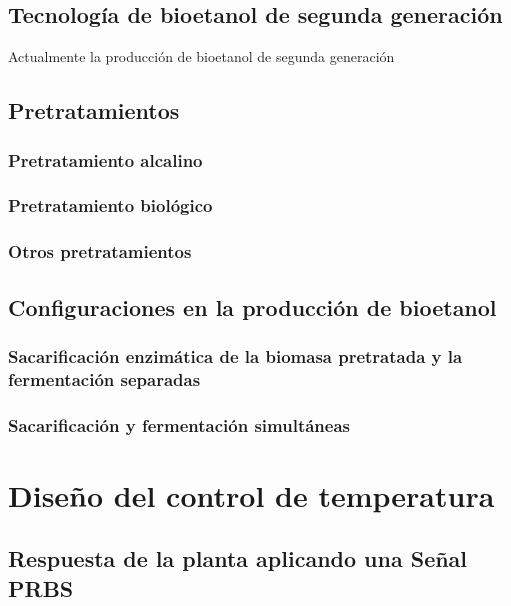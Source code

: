 \documentclass[12pt]{article}
\begin{document}
\subsection{Tecnología de bioetanol de segunda generación}
Actualmente la producción de bioetanol de segunda generación
\subsection{Pretratamientos }

\subsubsection{Pretratamiento alcalino }
\subsubsection{Pretratamiento biológico }
\subsubsection{Otros pretratamientos }


\subsection{Configuraciones en la producción de bioetanol}

\subsubsection{Sacarificación enzimática de la biomasa pretratada y la fermentación separadas }
\subsubsection{Sacarificación y fermentación simultáneas }
\newpage
		
		
	
	
	\section{Diseño del control de temperatura}
	
	\label{diseño del control de temp}
	
	
	
	\subsection{Respuesta de la planta aplicando una Señal PRBS}
	
\end{document}
